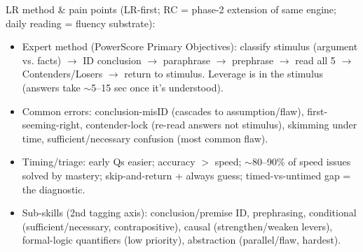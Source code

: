 \documentclass[11pt]{article}
\begin{document}
LR method \& pain points (LR-first; RC = phase-2 extension of same engine; daily reading = fluency substrate):
\begin{itemize}
\item Expert method (PowerScore Primary Objectives): classify stimulus (argument vs. facts) $\rightarrow$ ID conclusion $\rightarrow$ paraphrase $\rightarrow$ prephrase $\rightarrow$ read all 5 $\rightarrow$ Contenders/Losers $\rightarrow$ return to stimulus. Leverage is in the stimulus (answers take $\sim$5--15 sec once it's understood).
\item Common errors: conclusion-misID (cascades to assumption/flaw), first-seeming-right, contender-lock (re-read answers not stimulus), skimming under time, sufficient/necessary confusion (most common flaw).
\item Timing/triage: early Qs easier; accuracy $>$ speed; $\sim$80--90\% of speed issues solved by mastery; skip-and-return + always guess; timed-vs-untimed gap = the diagnostic.
\item Sub-skills (2nd tagging axis): conclusion/premise ID, prephrasing, conditional (sufficient/necessary, contrapositive), causal (strengthen/weaken levers), formal-logic quantifiers (low priority), abstraction (parallel/flaw, hardest).
\end{itemize}
\end{document}
